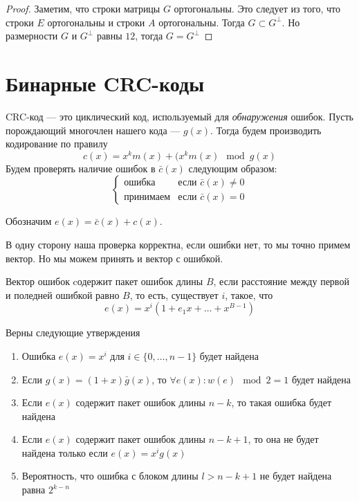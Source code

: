 \begin{proof}
Заметим, что строки матрицы $G$ ортогональны. Это следует из того, что строки $E$
ортогональны и строки $A$ ортогональны. Тогда $G \subset G^{\bot}$. Но 
размерности $G$ и $G^{\bot}$ равны $12$, тогда $G = G^{\bot}$
\end{proof}

\section{Бинарные CRC-коды}

\begin{definition}
 CRC-код --- это циклический код, используемый для \emph{обнаружения} ошибок.
 Пусть порождающий многочлен нашего кода --- $g(x)$. Тогда
 будем производить кодирование по правилу $$c(x) = x^{k} m(x) + (x^k m(x) \mod g(x)$$
 Будем проверять наличие ошибок в $\bar{c}(x)$ следующим образом:
 $$\begin{cases} \text{ошибка} & \text{если } \bar{c}(x) \neq 0 \\
				\text{принимаем} & \text{если } \bar{c}(x) = 0 
	\end{cases}$$
	
Обозначим $e(x) = \bar{c}(x) + c(x)$.
\end{definition}



\begin{remark}
В одну сторону наша проверка корректна, если ошибки нет, то мы точно примем вектор.
Но мы можем принять и вектор с ошибкой. 
\end{remark}

\begin{definition}
Вектор ошибок cодержит пакет ошибок длины $B$, если расстояние между
первой и поледней ошибкой равно $B$, то есть, существует $i$, такое, что
$$e(x) = x^i (1 + e_1 x + \ldots + x^{B-1})$$
\end{definition}

\begin{proposition}
Верны следующие утверждения
\begin{enumerate}
\item Ошибка $e(x) = x^i$ для $i \in \{0, \ldots, n-1\}$ будет найдена
\item Если $g(x) = (1+x) \bar{g}(x)$, то $\forall e(x) \colon w(e) \mod 2 = 1$
 будет найдена
\item Если $e(x)$ содержит пакет ошибок длины $n-k$, то такая ошибка
будет найдена
\item Если $e(x)$ содержит пакет ошибок длины $n-k+1$, то она не будет найдена
только если $e(x) = x^i g(x)$
\item Вероятность, что ошибка с блоком длины $l > n-k+1$ не будет найдена 
равна $2^{k-n}$
\end{enumerate}
\end{proposition}


